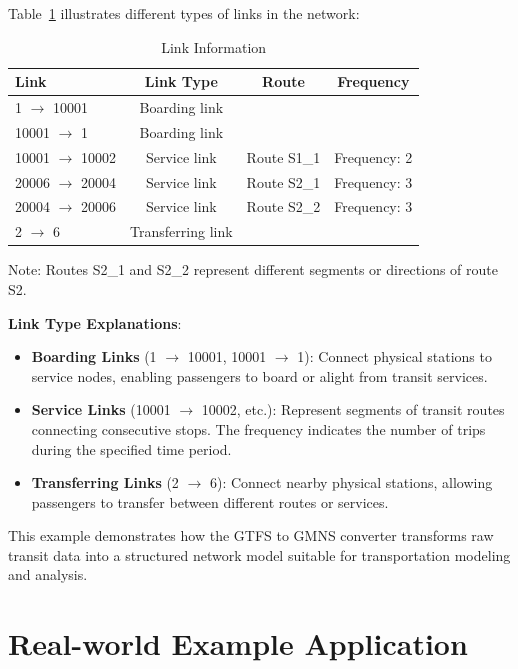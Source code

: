 \documentclass[11pt,a4paper]{article}
\begin{document}
Table~\ref{tab:link_info} illustrates different types of links in the network:

\begin{table}[h]
\centering
\caption{Link Information}
\label{tab:link_info}
\begin{tabular}{lccc}
\toprule
\textbf{Link} & \textbf{Link Type} & \textbf{Route}  & \textbf{Frequency}\\
\midrule
1 $\rightarrow$ 10001 & Boarding link & &  \\
10001 $\rightarrow$ 1 & Boarding link & &  \\
10001 $\rightarrow$ 10002 & Service link & Route S1\_1 &  Frequency: 2 \\
20006 $\rightarrow$ 20004 & Service link & Route S2\_1 &  Frequency: 3 \\
20004 $\rightarrow$ 20006 & Service link & Route S2\_2 &  Frequency: 3 \\
2 $\rightarrow$ 6 & Transferring link & & \\
\bottomrule
\end{tabular}
\end{table}

Note: Routes S2\_1 and S2\_2 represent different segments or directions of route S2.

\textbf{Link Type Explanations}:
\begin{itemize}
    \item \textbf{Boarding Links} (1 $\rightarrow$ 10001, 10001 $\rightarrow$ 1): Connect physical stations to service nodes, enabling passengers to board or alight from transit services.
    \item \textbf{Service Links} (10001 $\rightarrow$ 10002, etc.): Represent segments of transit routes connecting consecutive stops. The frequency indicates the number of trips during the specified time period.
    \item \textbf{Transferring Links} (2 $\rightarrow$ 6): Connect nearby physical stations, allowing passengers to transfer between different routes or services.
\end{itemize}

This example demonstrates how the GTFS to GMNS converter transforms raw transit data into a structured network model suitable for transportation modeling and analysis.


\section{Real-world Example Application}
\end{document}
